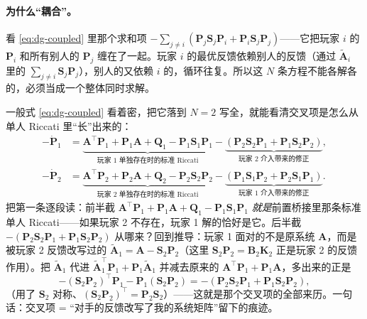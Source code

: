 \paragraph{为什么“耦合”。}
看 \cref{eq:dg-coupled} 里那个求和项 $-\sum_{j\ne i}(\mathbf P_j\mathbf S_j\mathbf P_i+\mathbf P_i\mathbf S_j\mathbf P_j)$——它把玩家 $i$ 的 $\mathbf P_i$ 和所有别人的 $\mathbf P_j$ 缠在了一起。玩家 $i$ 的最优反馈依赖别人的反馈（通过 $\tilde{\mathbf A}_i$ 里的 $\sum_{j\ne i}\mathbf S_j\mathbf P_j$），别人的又依赖 $i$ 的，循环往复。所以这 $N$ 条方程不能各解各的，必须当成一个整体同时求解。

\begin{derivation}
\label{deriv:dg-2p}
一般式 \cref{eq:dg-coupled} 看着密，把它落到 $N=2$ 写全，就能看清交叉项是怎么从单人 Riccati 里“长”出来的：
\begin{align*}
  -\dot{\mathbf P}_1&=\underbrace{\mathbf A^\top \mathbf P_1+\mathbf P_1\mathbf A+\mathbf Q_1-\mathbf P_1\mathbf S_1\mathbf P_1}_{\text{玩家 1 单独存在时的标准 Riccati}}-\underbrace{(\mathbf P_2\mathbf S_2\mathbf P_1+\mathbf P_1\mathbf S_2\mathbf P_2)}_{\text{玩家 2 介入带来的修正}},\\
  -\dot{\mathbf P}_2&=\underbrace{\mathbf A^\top \mathbf P_2+\mathbf P_2\mathbf A+\mathbf Q_2-\mathbf P_2\mathbf S_2\mathbf P_2}_{\text{玩家 2 单独存在时的标准 Riccati}}-\underbrace{(\mathbf P_1\mathbf S_1\mathbf P_2+\mathbf P_2\mathbf S_1\mathbf P_1)}_{\text{玩家 1 介入带来的修正}}.
\end{align*}
把第一条逐段读：前半截 $\mathbf A^\top \mathbf P_1+\mathbf P_1\mathbf A+\mathbf Q_1-\mathbf P_1\mathbf S_1\mathbf P_1$ \emph{就是}前置桥接里那条标准单人 Riccati——如果玩家 2 不存在，玩家 1 解的恰好是它。后半截 $-(\mathbf P_2\mathbf S_2\mathbf P_1+\mathbf P_1\mathbf S_2\mathbf P_2)$ 从哪来？回到推导：玩家 1 面对的不是原系统 $\mathbf A$，而是被玩家 2 反馈改写过的 $\tilde{\mathbf A}_1=\mathbf A-\mathbf S_2\mathbf P_2$（这里 $\mathbf S_2\mathbf P_2=\mathbf B_2\mathbf K_2$ 正是玩家 2 的反馈作用）。把 $\tilde{\mathbf A}_1$ 代进 $\tilde{\mathbf A}_1^\top \mathbf P_1+\mathbf P_1\tilde{\mathbf A}_1$ 并减去原来的 $\mathbf A^\top \mathbf P_1+\mathbf P_1\mathbf A$，多出来的正是
\[
  -(\mathbf S_2\mathbf P_2)^\top \mathbf P_1-\mathbf P_1(\mathbf S_2\mathbf P_2)=-(\mathbf P_2\mathbf S_2\mathbf P_1+\mathbf P_1\mathbf S_2\mathbf P_2),
\]
（用了 $\mathbf S_2$ 对称、$(\mathbf S_2\mathbf P_2)^\top=\mathbf P_2\mathbf S_2$）——这就是那个交叉项的全部来历。一句话：交叉项 = “对手的反馈改写了我的系统矩阵”留下的痕迹。
\end{derivation}

